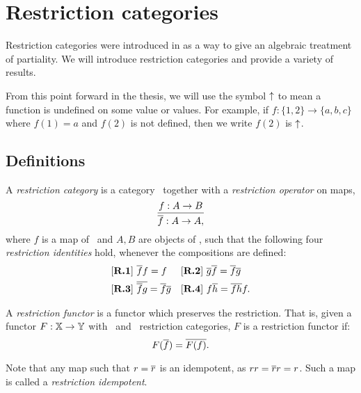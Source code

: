 
\chapter{Restriction categories} %
\label{chap:restriction_categories}


Restriction categories were introduced in
\cite{cockett2002:restcategories1,cockettlack2003:restcategories2,cockettlack2004:restcategories3}
as a way to give an algebraic treatment of partiality. We will introduce restriction
categories and provide a variety of results.

From this point forward in the thesis, we will use the symbol $\uparrow$ to mean a function is
undefined on some value or values. For example, if $f: \{1,2\} \to \{a,b,c\}$ where $f(1) = a$ and
$f(2)$ is not defined, then we write $f(2)$ is $\uparrow$.

\section{Definitions}
\label{sec:definitions}


\begin{definition}\label{def:restriction_category}
  A \emph{restriction category} is a category \X\ together with a \emph{restriction operator} on
  maps,
  \[
    \infer{\restr{f}:A\to A,}{f:A \to B}
  \]
  where $f$ is a map of \X\ and $A,B$ are objects of \X, such that the
  following four \emph{restriction identities} hold, whenever the
  compositions are defined:
  \begin{align*}
    &[\text{\bfseries {R}.{1}}]\ \overline{f} f = f & &
    [\text{\bfseries {R}.{2}}]\ \overline{g}  \overline{f} = \overline{f}  \overline{g}\\
    &[\text{\bfseries {R}.{3}}]\ \overline{\overline{f}  g} = \overline{f}   \overline{g} & &
    [\text{\bfseries {R}.{4}}]\  f \overline{h} = \overline{f h} f.
  \end{align*}
\end{definition}

\begin{definition}
  A \emph{restriction functor} is a functor which preserves the restriction. That is,
  given a functor $F: \mathbb{X} \to \mathbb{Y}$ with \X\  and \Y\ restriction categories,
  $F$ is a restriction functor if:
  \[
    F(\overline{f}) = \overline{F(f)}.
  \]
\end{definition}

Note that any map such that $r=\overline{r}$ is an idempotent, as $r r = \overline{r} r = r$.
Such a map is called a \emph{restriction idempotent}.

